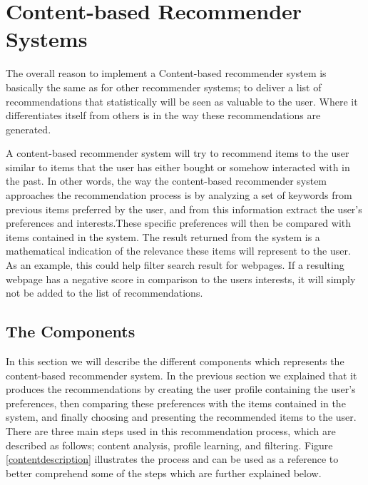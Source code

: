 \section{Content-based Recommender Systems}
\label{sec:content}
The overall reason to implement a Content-based recommender system is basically the same as for other recommender systems; to deliver a list of recommendations that statistically will be seen as valuable to the user. Where it differentiates itself from others is in the way these recommendations are generated.\newline 

A content-based recommender system will try to recommend items to the user similar to items that the user has either bought or somehow interacted with in the past. In other words, the way the content-based recommender system approaches the recommendation process is by analyzing a set of keywords from previous items preferred by the user, and from this information extract the user's preferences and interests.These specific preferences will then be compared with items contained in the system.\newline
The result returned from the system is a mathematical indication of the relevance these items will represent to the user. As an example, this could help filter search result for webpages. If a resulting webpage has a negative score in comparison to the users interests, it will simply not be added to the list of recommendations.
\subsection{The Components}
In this section we will describe the different components which represents the content-based recommender system. In the previous section we explained that it produces the recommendations by creating the user profile containing the user's preferences, then comparing these preferences with the items contained in the system, and finally choosing and presenting the recommended items to the user. \newline
There are three main steps used in this recommendation process, which are described as follows; content analysis, profile learning, and filtering. Figure \ref{contentdescription} illustrates the process and can be used as a reference to better comprehend some of the steps which are further explained below.

